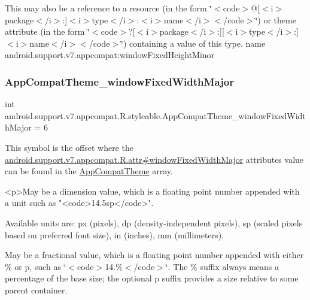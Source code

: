 This may also be a reference to a resource (in the form \char`\"{}$<$code$>$@\mbox{[}$<$i$>$package$<$/i$>$\+:\mbox{]}$<$i$>$type$<$/i$>$\+:$<$i$>$name$<$/i$>$$<$/code$>$\char`\"{}) or theme attribute (in the form \char`\"{}$<$code$>$?\mbox{[}$<$i$>$package$<$/i$>$\+:\mbox{]}\mbox{[}$<$i$>$type$<$/i$>$\+:\mbox{]}$<$i$>$name$<$/i$>$$<$/code$>$\char`\"{}) containing a value of this type.  name android.\+support.\+v7.\+appcompat\+:window\+Fixed\+Height\+Minor \mbox{\label{classandroid_1_1support_1_1v7_1_1appcompat_1_1R_1_1styleable_aa1e116caa12a145c67596dd4910cfd53}} 
\subsubsection{\texorpdfstring{App\+Compat\+Theme\+\_\+window\+Fixed\+Width\+Major}{AppCompatTheme\_windowFixedWidthMajor}}
{\footnotesize\ttfamily int android.\+support.\+v7.\+appcompat.\+R.\+styleable.\+App\+Compat\+Theme\+\_\+window\+Fixed\+Width\+Major = 6\hspace{0.3cm}{\ttfamily [static]}}

This symbol is the offset where the \hyperlink{classandroid_1_1support_1_1v7_1_1appcompat_1_1R_1_1attr_ae79b85d9c96e6c1271593d8f7bb17458}{android.\+support.\+v7.\+appcompat.\+R.\+attr\#window\+Fixed\+Width\+Major} attribute\textquotesingle{}s value can be found in the \hyperlink{classandroid_1_1support_1_1v7_1_1appcompat_1_1R_1_1styleable_a5c42f89e8a410c323be34208d75c430b}{App\+Compat\+Theme} array.

\begin{DoxyVerb}      <p>May be a dimension value, which is a floating point number appended with a unit such as "<code>14.5sp</code>".
\end{DoxyVerb}
 Available units are\+: px (pixels), dp (density-\/independent pixels), sp (scaled pixels based on preferred font size), in (inches), mm (millimeters). 

May be a fractional value, which is a floating point number appended with either \% or p, such as \char`\"{}$<$code$>$14.\%$<$/code$>$\char`\"{}. The \% suffix always means a percentage of the base size; the optional p suffix provides a size relative to some parent container. 

